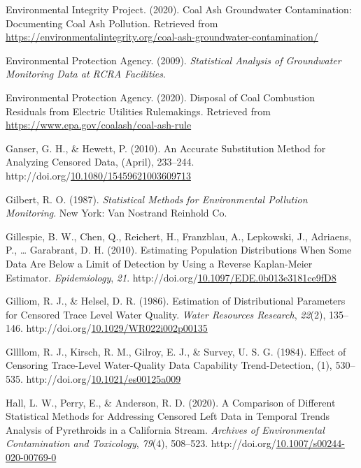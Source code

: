 \documentclass[12pt, twoside]{amherstthesis}
\newenvironment{CSLReferences}%
  {}%
  {\par}
\begin{document}
\begin{CSLReferences}{1}{0}
\leavevmode\hypertarget{ref-EIP2020}{}%
Environmental Integrity Project. (2020). {Coal Ash Groundwater Contamination: Documenting Coal Ash Pollution}. Retrieved from \url{https://environmentalintegrity.org/coal-ash-groundwater-contamination/}

\leavevmode\hypertarget{ref-EPA2009}{}%
Environmental Protection Agency. (2009). \emph{{Statistical Analysis of Groundwater Monitoring Data at RCRA Facilities}}.

\leavevmode\hypertarget{ref-Car2020}{}%
Environmental Protection Agency. (2020). {Disposal of Coal Combustion Residuals from Electric Utilities Rulemakings}. Retrieved from \url{https://www.epa.gov/coalash/coal-ash-rule}

\leavevmode\hypertarget{ref-Ganser2010}{}%
Ganser, G. H., \& Hewett, P. (2010). {An Accurate Substitution Method for Analyzing Censored Data}, (April), 233--244. http://doi.org/\href{https://doi.org/10.1080/15459621003609713}{10.1080/15459621003609713}

\leavevmode\hypertarget{ref-Gilbert1987}{}%
Gilbert, R. O. (1987). \emph{{Statistical Methods for Environmental Pollution Monitoring}}. New York: Van Nostrand Reinhold Co.

\leavevmode\hypertarget{ref-Gillespie2010}{}%
Gillespie, B. W., Chen, Q., Reichert, H., Franzblau, A., Lepkowski, J., Adriaens, P., \ldots{} Garabrant, D. H. (2010). {Estimating Population Distributions When Some Data Are Below a Limit of Detection by Using a Reverse Kaplan-Meier Estimator}. \emph{Epidemiology}, \emph{21}. http://doi.org/\href{https://doi.org/10.1097/EDE.0b013e3181ce9fD8}{10.1097/EDE.0b013e3181ce9fD8}

\leavevmode\hypertarget{ref-Gilliom1986}{}%
Gilliom, R. J., \& Helsel, D. R. (1986). {Estimation of Distributional Parameters for Censored Trace Level Water Quality}. \emph{Water Resources Research}, \emph{22}(2), 135--146. http://doi.org/\href{https://doi.org/10.1029/WR022i002p00135}{10.1029/WR022i002p00135}

\leavevmode\hypertarget{ref-Gillom1984}{}%
Gllllom, R. J., Kirsch, R. M., Gilroy, E. J., \& Survey, U. S. G. (1984). {Effect of Censoring Trace-Level Water-Quality Data Capability Trend-Detection}, (1), 530--535. http://doi.org/\href{https://doi.org/10.1021/es00125a009}{10.1021/es00125a009}

\leavevmode\hypertarget{ref-Hall2020}{}%
Hall, L. W., Perry, E., \& Anderson, R. D. (2020). {A Comparison of Different Statistical Methods for Addressing Censored Left Data in Temporal Trends Analysis of Pyrethroids in a California Stream}. \emph{Archives of Environmental Contamination and Toxicology}, \emph{79}(4), 508--523. http://doi.org/\href{https://doi.org/10.1007/s00244-020-00769-0}{10.1007/s00244-020-00769-0}


\end{CSLReferences}
\end{document}
